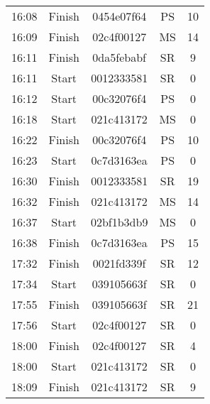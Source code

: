 \begin{table}[ht]
\begin{tabular}{cc|cc|c}
16:08 & Finish  & 0454e07f64 & PS  & 10 \\
16:09 & Finish  & 02c4f00127 & MS  & 14 \\
16:11 & Finish  & 0da5febabf & SR  & 9  \\
16:11 & Start   & 0012333581 & SR  & 0  \\
16:12 & Start   & 00c32076f4 & PS  & 0  \\
16:18 & Start   & 021c413172 & MS  & 0  \\
16:22 & Finish  & 00c32076f4 & PS  & 10 \\
16:23 & Start   & 0c7d3163ea & PS  & 0  \\
16:30 & Finish  & 0012333581 & SR  & 19 \\
16:32 & Finish  & 021c413172 & MS  & 14 \\
16:37 & Start   & 02bf1b3db9 & MS  & 0  \\
16:38 & Finish  & 0c7d3163ea & PS  & 15 \\
17:32 & Finish  & 0021fd339f & SR  & 12 \\
17:34 & Start   & 039105663f & SR  & 0  \\
17:55 & Finish  & 039105663f & SR  & 21 \\
17:56 & Start   & 02c4f00127 & SR  & 0  \\
18:00 & Finish  & 02c4f00127 & SR  & 4  \\
18:00 & Start   & 021c413172 & SR  & 0  \\
18:09 & Finish  & 021c413172 & SR  & 9  \\
\end{tabular}
\end{table}


